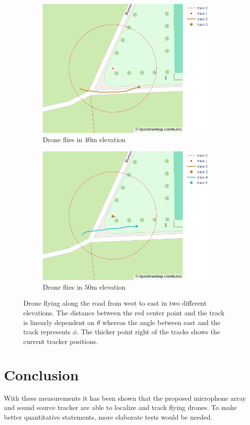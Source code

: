 \begin{figure}[h]
	\centering
	\begin{subfigure}[t]{0.45\textwidth}
		\centering
		\includegraphics[width=\textwidth]{images/7_measurements/we_low.png}
		\caption{Drone flies in $40$m elevation}
		\label{meas:fig:west east low}
	\end{subfigure}
	\hfill
	\begin{subfigure}[t]{0.45\textwidth}
		\centering
		\includegraphics[width=\textwidth]{images/7_measurements/we_high.png}
		\caption{Drone flies in $50$m elevation}
		\label{meas:fig:west east high}
	\end{subfigure}
	\caption{Drone flying along the road from west to east in two different
    elevations.
    The distance between the red center point and the track is linearly 
    dependent on $\theta$ whereas the angle between east and the track represents $\phi$.
    The thicker point right of the tracks shows the current tracker positions.}
	\label{meas:fig:west east}
\end{figure}

\section{Conclusion}
With these measurements it has been shown that the proposed microphone 
array and sound source tracker are able 
to localize and track flying drones.
To make better quantitative statements, more elaborate tests
would be needed.